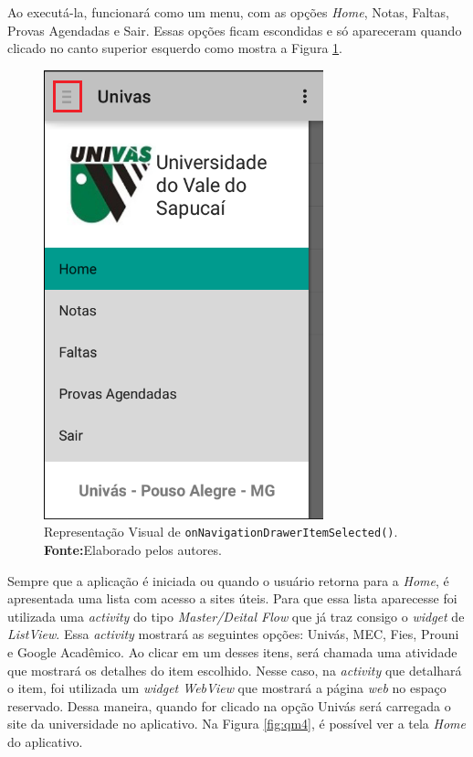 	\par Ao executá-la, funcionará como um menu, com as opções \textit{Home},
Notas, Faltas, Provas Agendadas e Sair. Essas opções ficam escondidas e só apareceram
quando clicado no canto superior esquerdo como mostra a Figura
\ref{fig:qm3}.
		
		\begin{figure}[h!]
			\centerline{\includegraphics[scale=0.5]{./imagens/2_q_metodologico/qm3.png}}
			\caption[Representação Visual de
			\texttt{onNavigationDrawerItemSelected()}]{Representação Visual de
			\texttt{onNavigationDrawerItemSelected()}.
			 \textbf{Fonte:}Elaborado pelos autores.}
			\label{fig:qm3}
		\end{figure}
	
	\par Sempre que a aplicação é iniciada ou quando o usuário retorna para a
\textit{Home}, é apresentada uma lista com acesso a sites úteis. Para que essa
lista aparecesse foi utilizada uma \textit{activity} do tipo
\textit{Master/Deital Flow} que já traz consigo o \textit{widget} de
\textit{ListView}. Essa \textit{activity} mostrará as seguintes opções: Univás,
MEC, Fies, Prouni e Google Acadêmico. Ao clicar em um desses itens, será
chamada uma atividade que mostrará os detalhes do item escolhido. Nesse caso, na
\textit{activity} que detalhará o item, foi utilizada um \textit{widget WebView}
que mostrará a página \textit{web} no espaço reservado. Dessa maneira, quando
for clicado na opção Univás será carregada o site da universidade no
aplicativo. Na Figura \ref{fig:qm4}, é possível ver a tela  \textit{Home}
do aplicativo.
	
